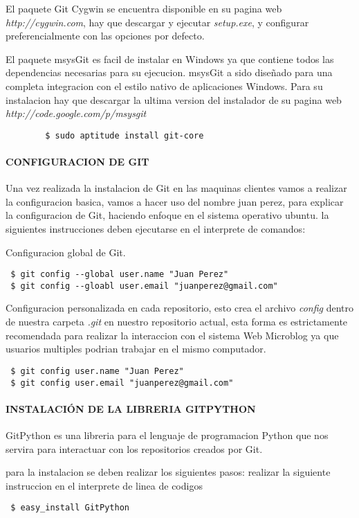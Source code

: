 El paquete Git Cygwin se encuentra disponible en su pagina web \textit{http://cygwin.com}, hay que descargar y ejecutar \textit{setup.exe}, y configurar preferencialmente
con las opciones por defecto.

El paquete msysGit es facil de instalar en Windows ya que contiene todos las dependencias necesarias para su ejecucion. msysGit a sido diseñado para una completa integracion 
con el estilo nativo de aplicaciones Windows. Para su instalacion hay que descargar la ultima version del instalador de su pagina web \textit{http://code.google.com/p/msysgit}

\begin{proc}
	\begin{verbatim}
 		$ sudo aptitude install git-core
	\end{verbatim}
\end{proc}
\paragraph{CONFIGURACION DE GIT}
Una vez realizada la instalacion de Git en las maquinas clientes vamos a realizar la configuracion basica, vamos a hacer uso del nombre juan perez, para explicar la configuracion de Git, haciendo enfoque en el sistema operativo ubuntu.
la siguientes instrucciones deben ejecutarse en el interprete de comandos:

Configuracion global de Git.
\begin{verbatim}
 $ git config --global user.name "Juan Perez"
 $ git config --gloabl user.email "juanperez@gmail.com"
\end{verbatim}
Configuracion personalizada en cada repositorio, esto crea el archivo \textit{config} dentro de nuestra carpeta \textit{.git} en nuestro repositorio actual, esta forma es
estrictamente recomendada para realizar la interaccion con el sistema Web Microblog ya que usuarios multiples podrian trabajar en el mismo computador.
\begin{verbatim}
 $ git config user.name "Juan Perez"
 $ git config user.email "juanperez@gmail.com"
\end{verbatim}
\paragraph{INSTALACIÓN DE LA LIBRERIA GITPYTHON}
GitPython es una libreria para el lenguaje de programacion Python que nos servira para interactuar con
los repositorios creados por Git.

para la instalacion se deben realizar los siguientes pasos:
realizar la siguiente instruccion en el interprete de linea de codigos
\begin{verbatim}
 $ easy_install GitPython
\end{verbatim}

